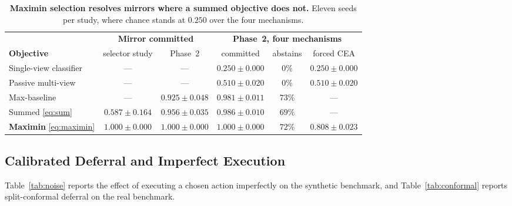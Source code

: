 \documentclass{article} %
\theoremstyle{defstyle}
\theoremstyle{plain}
\begin{document}
\begin{table}[!ht]
\caption{\textbf{Maximin selection resolves mirrors where a summed objective does not.} Eleven seeds
per study, where chance stands at $0.250$ over the four mechanisms.}
\label{tab:phase2}
\begin{center}
\footnotesize
\begin{tabular}{lccccc}
\toprule
& \multicolumn{2}{c}{\textbf{Mirror committed}} &
\multicolumn{3}{c}{\textbf{Phase~2, four mechanisms}} \\
\cmidrule(lr){2-3}\cmidrule(lr){4-6}
\textbf{Objective} & selector study & Phase~2 & committed & abstains & forced CEA \\
\midrule
Single-view classifier & --- & --- & $0.250{\pm}0.000$ & $0\%$ & $0.250{\pm}0.000$ \\
Passive multi-view     & --- & --- & $0.510{\pm}0.020$ & $0\%$ & $0.510{\pm}0.020$ \\
Max-baseline           & --- & $0.925{\pm}0.048$ & $0.981{\pm}0.011$ & $73\%$ & --- \\
Summed \eqref{eq:sum}  & $0.587{\pm}0.164$ & $0.956{\pm}0.035$ & $0.986{\pm}0.010$ & $69\%$ & --- \\
\textbf{Maximin} \eqref{eq:maximin} & $\mathbf{1.000{\pm}0.000}$ & $\mathbf{1.000{\pm}0.000}$ & $\mathbf{1.000{\pm}0.000}$ & $72\%$ & $\mathbf{0.808{\pm}0.023}$ \\
\bottomrule
\end{tabular}
\end{center}
\end{table}

\subsection{Calibrated Deferral and Imperfect Execution}
\label{sec:supp-noise}

Table~\ref{tab:noise} reports the effect of executing a chosen action imperfectly on the
synthetic benchmark, and Table~\ref{tab:conformal} reports split-conformal deferral on the
real benchmark.
\end{document}
